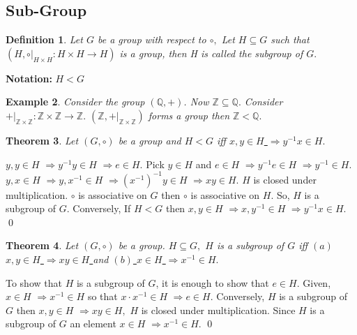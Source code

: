 \documentclass[11pt]{amsart}
\newtheorem{theorem}{Theorem}[section]
\newtheorem{definition}[theorem]{Definition}%
\newtheorem{example}[theorem]{Example}%
\newcommand{\QQ}{\mathbb Q}
\newcommand{\ZZ}{\mathbb Z}
\begin{document}
\subsection{Sub-Group}
\begin{definition}
Let $G$ be a group with respect to $\circ,$ Let $H\subseteq G$ such that $(H, \circ|_{H\times H}: H\times H \rightarrow H)$ is a group, then H is called the subgroup of $G.$
\end{definition}
\textbf{Notation:} $H<G$
\begin{example}
Consider the group $({\QQ},+)$. Now ${\ZZ}\subseteq {\QQ}.$ Consider $+|_{ {\ZZ}\times{\ZZ}}: {\ZZ}\times{\ZZ}\rightarrow {\ZZ}.$ $({\ZZ}, +|_{ {\ZZ}\times{\ZZ}})$ forms a group then ${\ZZ}<{\QQ}.$
\end{example}
\begin{theorem}
Let $(G, \circ)$ be a group and $H<G$ iff \underline{ $x,y \in H$ $\Rightarrow y^{-1}x \in H.$ }
\end{theorem}
\proof $y,y\in H$ $\Rightarrow y^{-1}y \in H$ $\Rightarrow e \in H.$ Pick $y \in H$ and $e \in H$ $\Rightarrow y^{-1}e \in H$ $\Rightarrow y^{-1} \in H.$ $y,x \in H$ $\Rightarrow y,x^{-1} \in H$ $\Rightarrow (x^{-1})^{-1}y \in H$ $\Rightarrow xy \in H.$ $H$ is closed under multiplication. $\circ$ is associative on $G$ then $\circ$ is associative on $H.$ So, $H$ is a subgroup of $G.$ Conversely, If $H<G$ then $x,y \in H$ $\Rightarrow x,y^{-1} \in H$ $\Rightarrow y^{-1}x \in H.$ \qed
\begin{theorem}
Let $(G,\circ)$ be a group. $H \subseteq G,$ $H$ is a subgroup of $G$ iff \underline{$(a)$ $x,y \in H$ $\Rightarrow xy \in H$ } and \underline{ $(b)$ $x\in H$ $\Rightarrow x^{-1} \in H.$ }
\end{theorem}
\proof To show that $H$ is a subgroup of $G$, it is enough to show that $e \in H.$ Given, $x\in H$ $\Rightarrow x^{-1} \in H$ so that $x\cdot x^{-1} \in H$ $\Rightarrow e \in H.$ Conversely, $H$ is a subgroup of $G$ then $x,y \in H$ $\Rightarrow xy \in H,$ $H$ is closed under multiplication. Since $H$ is a subgroup of $G$ an element $x \in H$ $\Rightarrow x^{-1} \in H.$ \qed
\end{document}
